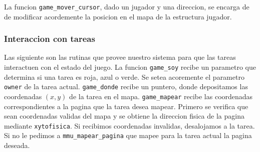 La funcion \verb|game_mover_cursor|, dado un jugador y una direccion, se encarga de de modificar acordemente la posicion en el mapa de la estructura jugador.

\subsubsection{Interaccion con tareas}

Las siguiente son las rutinas que provee nuestro sistema para que las tareas interactuen con el estado del juego.
La funcion \verb|game_soy| recibe un parametro que determina si una tarea es roja, azul o verde. Se setea acoremente el parametro \verb|owner| de la tarea actual.
\verb|game_donde| recibe un puntero, donde depositamos las coordenadas $(x,y)$ de la tarea en el mapa.
\verb|game_mapear| recibe las coordenadas correspondientes a la pagina que la tarea desea mapear. Primero se verifica que sean coordenadas validas del mapa y se obtiene la direccion fisica de la pagina mediante \verb|xytofisica|. Si recibimos coordenadas invalidas, desalojamos a la tarea. Si no le pedimos a \verb|mmu_mapear_pagina| que mapee para la tarea actual la pagina deseada.


